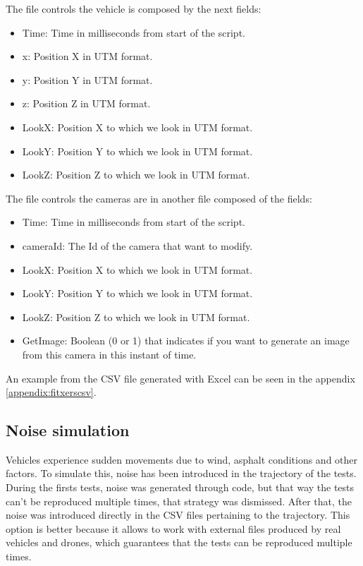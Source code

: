 \documentclass[10pt,a4paper,twocolumn,twoside]{article}
\begin{document}
The file controls the vehicle is composed by the next fields:

\begin{itemize}
\item Time: Time in milliseconds from start of the script.
\item x: Position X in UTM format.
\item y: Position Y in UTM format.
\item z: Position Z in UTM format.
\item LookX: Position X to which we look in UTM format.
\item LookY: Position Y to which we look in UTM format.
\item LookZ: Position Z to which we look in UTM format.
\end{itemize}

The file controls the cameras are in another file composed of the fields:

\begin{itemize}
\item Time: Time in milliseconds from start of the script.
\item cameraId: The Id of the camera that want to modify.
\item LookX: Position X to which we look in UTM format.
\item LookY: Position Y to which we look in UTM format.
\item LookZ: Position Z to which we look in UTM format.
\item GetImage: Boolean (0 or 1) that indicates if you want to generate an image from this camera in this instant of time.
\end{itemize}

An example from the CSV file generated with Excel can be seen in the appendix \ref{appendix:fitxerscsv}.

\subsection{Noise simulation}

Vehicles experience sudden movements due to wind, asphalt conditions and other factors. To simulate this, noise has been introduced in the trajectory of the tests. During the firsts tests, noise was generated through code, but that way the tests can't be reproduced multiple times, that strategy was dismissed. After that, the noise was introduced directly in the CSV files pertaining to the trajectory. This option is better because it allows to work with external files produced by real vehicles and drones, which guarantees that the tests can be reproduced multiple times.
\end{document}
